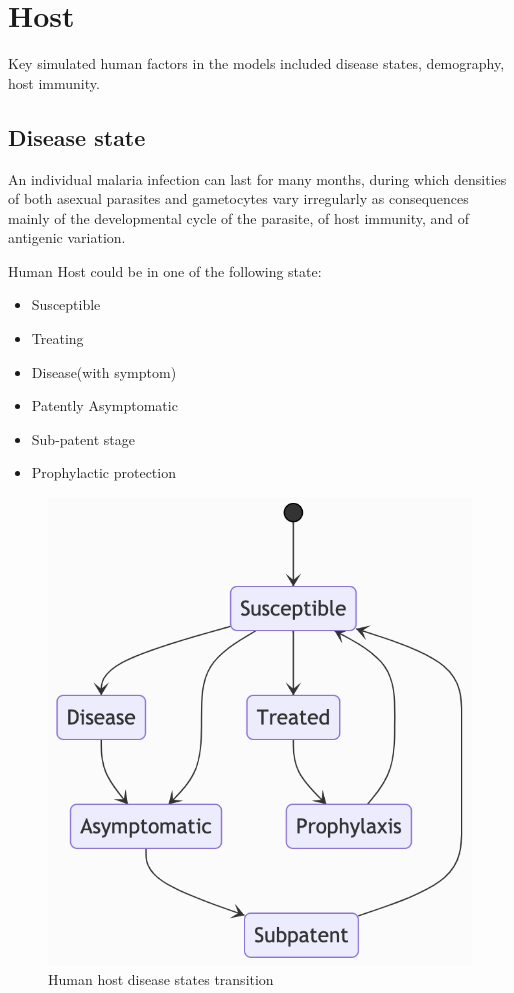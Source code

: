 \documentclass[a4paper, 12pt, twoside]{article}
\begin{document}
\section{Host}%
\label{sec:Host}

Key simulated human factors in the models included disease states, demography, host immunity.

\subsection{Disease state}

An individual malaria infection can last for many months, during which densities of both asexual parasites and gametocytes vary irregularly as consequences mainly of the developmental cycle of the parasite, of host immunity, and of antigenic variation.

Human Host could be in one of the following state:
\begin{itemize}
	\item Susceptible
	\item Treating
	\item Disease(with symptom)
	\item Patently Asymptomatic
	\item Sub-patent stage
	\item Prophylactic protection
\end{itemize}

\begin{figure}[t]
  \centering
  \includegraphics[keepaspectratio=true, scale=0.8]{images/disease-state-transition-diagram.png}
  \caption{Human host disease states transition}
\end{figure}
\end{document}
